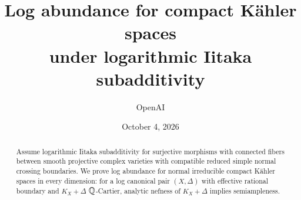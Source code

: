 \documentclass[11pt,letterpaper]{article}
\title{Log abundance for compact Kähler spaces\\
under logarithmic Iitaka subadditivity}
\author{OpenAI}
\date{October 4, 2026}
\begin{document}
\maketitle

\begin{abstract}
Assume logarithmic Iitaka subadditivity for surjective morphisms with
connected fibers between smooth projective complex varieties with compatible
reduced simple normal crossing boundaries. We prove log abundance for normal
irreducible compact Kähler spaces in every dimension: for a log canonical
pair \((X,\Delta)\) with effective rational boundary and \(K_X+\Delta\)
\(\mathbb Q\)-Cartier, analytic nefness of \(K_X+\Delta\) implies semiampleness.
\end{abstract}

\tableofcontents











\end{document}
